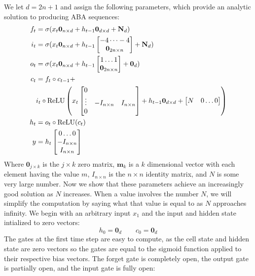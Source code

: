 We let $d = 2n + 1$ and assign the following parameters, which provide an analytic solution to producing ABA sequences:
%
\begin{align*}
  f_t &= \sigma(x_t \textbf{0}_{n\times d} + h_{t-1}\textbf{0}_{d \times d} + \textbf{N}_{d}) \\
  i_t &= \sigma(x_t\textbf{0}_{n\times d} + h_{t-1}\begin{bmatrix} -4 \dots -4 \\ \textbf{0}_{2n\times n} \end{bmatrix}  + \textbf{N}_d)   \\
  o_t &= \sigma(x_t\textbf{0}_{n\times d} +  h_{t-1} \begin{bmatrix} 1 \dots 1 \\ \textbf{0}_{2n\times n} \end{bmatrix} + \textbf{0}_{d})\\
  c_t &= f_t \circ c_{t-1} + \\
  & i_t \circ \operatorname{ReLU}\left(x_t \begin{bmatrix} 0 &  & \\ \vdots & -I_{n \times n} & I_{n \times n}\\ 0 & &  \end{bmatrix} + h_{t-1}\textbf{0}_{d \times d} + \begin{bmatrix} N & 0 \dots 0\end{bmatrix}\right) \\
  h_t &= o_t \circ \operatorname{ReLU}(c_t)\\
  y &= h_t \begin{bmatrix} 0 \dots 0 \\ -I_{n \times n} \\ I_{n \times n}  \end{bmatrix}
\end{align*}
%
Where $\textbf{0}_{j\times k}$ is the $j \times k$ zero matrix, $\textbf{m}_k$ is a $k$ dimensional vector with each element having the value $m$, $I_{n\times n}$ is the $n \times n$ identity matrix, and $N$ is some very large number.  Now we show that these parameters achieve an increasingly good solution as $N$ increases. When a value involves the number $N$, we will simplify the computation by saying what that value is equal to as $N$ approaches infinity. We begin with an arbitrary input $x_1$ and the input and hidden state intialized to zero vectors:
%
\[
  h_0 = \textbf{0}_d \qquad c_0 = \textbf{0}_d
\]
%
The gates at the first time step are easy to compute, as the cell state and hidden state are zero vectors so the gates are equal to the sigmoid function applied to their respective bias vectors. The forget gate is completely open, the output gate is partially open, and the input gate is fully open:
